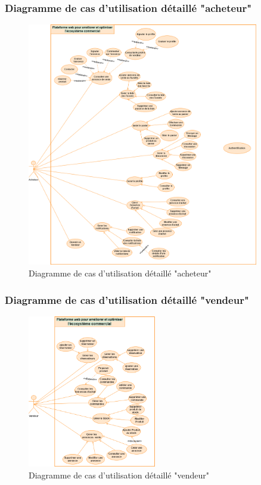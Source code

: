 \documentclass[edit,12pt,a4paper,ChapStyle,oneside,doubleinterligne]{report}
\begin{document}
\subsubsection{Diagramme de cas d'utilisation détaillé "acheteur" }
\begin{figure}[h!]\label{fig:Diagramme de cas d'utilisation détaillé "acheteur"}
\centering
\includegraphics[width=0.9\textwidth]{images/diagramme de cas ach.png}
\caption{Diagramme de cas d'utilisation détaillé "acheteur"}
\end{figure}
\newpage
\subsubsection{Diagramme de cas d'utilisation détaillé "vendeur" }
\begin{figure}[h!]\label{fig:Diagramme de cas d'utilisation détaillé "vendeur"}
\centering
\includegraphics[width=0.5\textwidth]{images/diagramme de cas ven.png}
\caption{Diagramme de cas d'utilisation détaillé "vendeur"}
\end{figure}
\newpage
\end{document}

